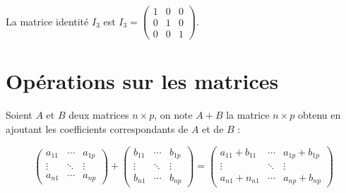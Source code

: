 \documentclass[a4paper,12pt]{book}
\begin{document}
\begin{exemple}[]
La matrice identité $I_3$ est
$I_3= \begin{pmatrix}
1&0&0\\
0&1&0\\
0&0&1
\end{pmatrix}$.
\end{exemple}

\section{Opérations sur les matrices}

\begin{definition}[ : addition]
Soient $A$ et $B$ deux matrices $n\times p$, on note $A+B$ la matrice $n\times p$ obtenu en ajoutant les coefficients correspondants de $A$ et de $B$ :

$$\begin{pmatrix}
    a_{11}      & \cdots & a_{1p} \\ 
 
    \vdots 	& \ddots & \vdots \\ 
    a_{n1}      & \cdots & a_{np}
\end{pmatrix} +\begin{pmatrix}
    b_{11}      & \cdots & b_{1p} \\ 
   
    \vdots 	& \ddots & \vdots \\ 
    b_{n1}      & \cdots & b_{np}
\end{pmatrix}=
\begin{pmatrix}
    a_{11} +b_{11}     & \cdots & a_{1p}+b_{1p} \\ 
  
    \vdots 	& \ddots & \vdots \\ 
    a_{n1}+n_{n1}      & \cdots & a_{np}+b_{np}
\end{pmatrix}$$
\end{definition}
\end{document}
